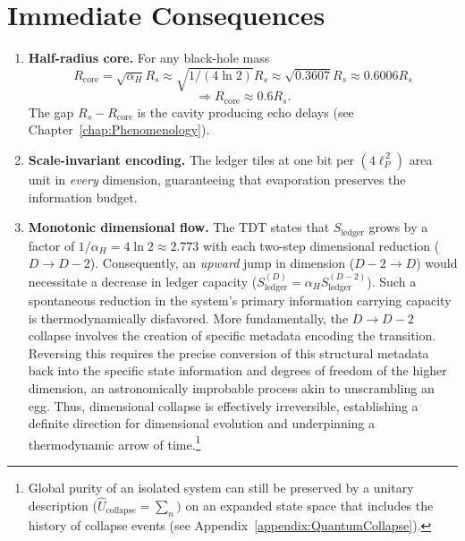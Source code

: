 \documentclass[a4paper, 12pt, oneside]{book}
\numberwithin{equation}{chapter}
\begin{document}
\section{Immediate Consequences}
\label{sec:ImmediateConsequences}

\begin{enumerate}[label=\textbf{C\arabic*}]
  \item \textbf{Half-radius core.}  For any black-hole mass
        \[
        R_{\text{core}} = \sqrt{\alpha_H} R_s \approx \sqrt{1/(4 \ln 2)}R_s \approx \sqrt{0.3607}R_s \approx 0.6006 R_s
        \]
        \[
            \Rightarrow R_{\text{core}}\approx 0.6 R_s. 
        \]
        The gap \(R_s - R_{\text{core}}\) is the cavity producing echo delays (see Chapter~\ref{chap:Phenomenology}).

  \item \textbf{Scale-invariant encoding.}
        The ledger tiles at one
        bit per $(4\ell_P^{\,2})$ area unit \cite{Bekenstein1973} in \emph{every}
        dimension, guaranteeing that evaporation preserves the
        information budget.

  \item \textbf{Monotonic dimensional flow.}
        The TDT states that $S_{\text{ledger}}$ grows by a factor of $1/\alpha_H = 4\ln 2 \approx 2.773$ with each two-step dimensional reduction ($D \to D-2$). Consequently, an \emph{upward} jump in dimension ($D-2 \to D$) would necessitate a decrease in ledger capacity ($S_{\text{ledger}}^{(D)} = \alpha_H S_{\text{ledger}}^{(D-2)}$). Such a spontaneous reduction in the system's primary information carrying capacity is thermodynamically disfavored. More fundamentally, the $D \to D-2$ collapse involves the creation of specific metadata encoding the transition. Reversing this requires the precise conversion of this structural metadata back into the specific state information and degrees of freedom of the higher dimension, an astronomically improbable process akin to unscrambling an egg. Thus, dimensional collapse is effectively irreversible, establishing a definite direction for dimensional evolution and underpinning a thermodynamic arrow of time.\footnote{Global purity of an isolated system can still be preserved by a unitary description ($\hat U_{\text{collapse}} = \sum_n)$ on an expanded state space that includes the history of collapse events (see Appendix~\ref{appendix:QuantumCollapse}).}
        
\end{enumerate}
\end{document}
